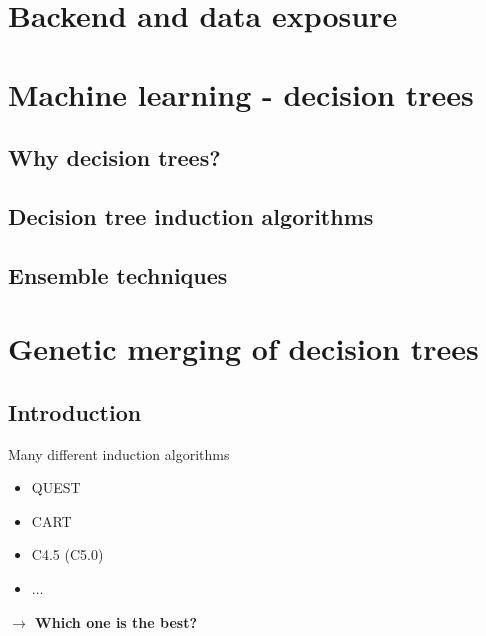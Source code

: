 \documentclass[english]{beamer}
\begin{document}
\section{Backend and data exposure}
\section{Machine learning - decision trees}

\subsection*{Why decision trees?}

\subsection*{Decision tree induction algorithms}

\subsection*{Ensemble techniques}

\section{Genetic merging of decision trees}
\subsection*{Introduction}

\begin{frame}{Many different induction algorithms}
	\begin{itemize}
		\item QUEST
		\item CART
		\item C4.5 (C5.0)
		\item $\ldots$
	\end{itemize} \vspace{2em}
	\textbf{$\rightarrow$ Which one is the best?}
\end{frame}
\end{document}
